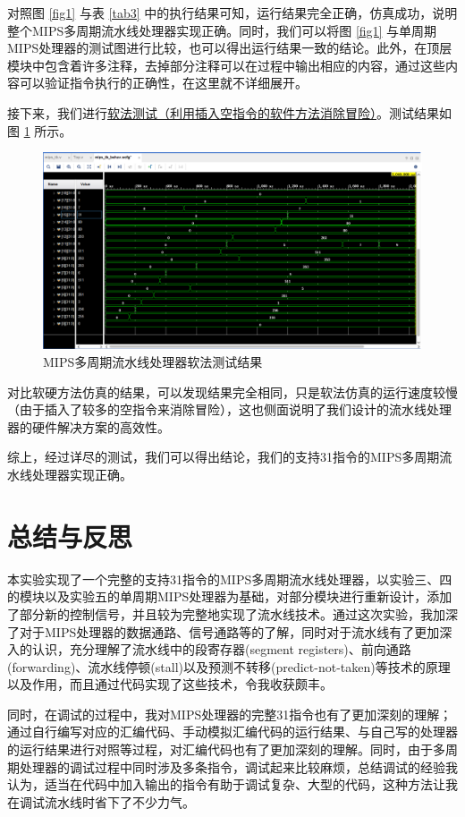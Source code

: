 \documentclass{cumcm}
\numberwithin{equation}{section}
\numberwithin{equation}{subsection}
\begin{document}
对照图 \ref{fig1} 与表 \ref{tab3} 中的执行结果可知，运行结果完全正确，仿真成功，说明整个MIPS多周期流水线处理器实现正确。同时，我们可以将图 \ref{fig1} 与单周期MIPS处理器的测试图进行比较，也可以得出运行结果一致的结论。此外，在顶层模块中包含着许多注释，去掉部分注释可以在过程中输出相应的内容，通过这些内容可以验证指令执行的正确性，在这里就不详细展开。

接下来，我们进行\underline{软法测试（利用插入空指令的软件方法消除冒险）}。测试结果如图 \ref{fig2} 所示。

\begin{figure}[htbp]
    \centering
    \includegraphics[width=7in]{2.png}
    \caption{MIPS多周期流水线处理器软法测试结果}
    \label{fig2}
\end{figure}

对比软硬方法仿真的结果，可以发现结果完全相同，只是软法仿真的运行速度较慢（由于插入了较多的空指令来消除冒险），这也侧面说明了我们设计的流水线处理器的硬件解决方案的高效性。

综上，经过详尽的测试，我们可以得出结论，我们的支持31指令的MIPS多周期流水线处理器实现正确。

\section{总结与反思}\label{section5}

本实验实现了一个完整的支持31指令的MIPS多周期流水线处理器，以实验三、四的模块以及实验五的单周期MIPS处理器为基础，对部分模块进行重新设计，添加了部分新的控制信号，并且较为完整地实现了流水线技术。通过这次实验，我加深了对于MIPS处理器的数据通路、信号通路等的了解，同时对于流水线有了更加深入的认识，充分理解了流水线中的段寄存器(segment registers)、前向通路(forwarding)、流水线停顿(stall)以及预测不转移(predict-not-taken)等技术的原理以及作用，而且通过代码实现了这些技术，令我收获颇丰。

同时，在调试的过程中，我对MIPS处理器的完整31指令也有了更加深刻的理解；通过自行编写对应的汇编代码、手动模拟汇编代码的运行结果、与自己写的处理器的运行结果进行对照等过程，对汇编代码也有了更加深刻的理解。同时，由于多周期处理器的调试过程中同时涉及多条指令，调试起来比较麻烦，总结调试的经验我认为，适当在代码中加入输出的指令有助于调试复杂、大型的代码，这种方法让我在调试流水线时省下了不少力气。
\end{document}
